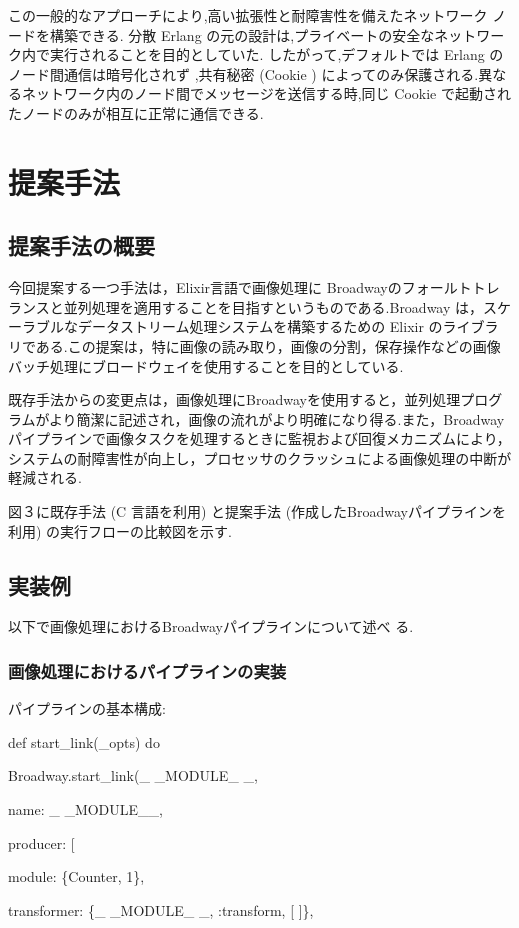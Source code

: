 \documentclass[a4paper]{jreport}	%
\begin{document}
この一般的なアプローチにより,高い拡張性と耐障害性を備えたネットワーク ノードを構築できる. 分散 Erlang の元の設計は,プライベートの安全なネットワーク内で実行されることを目的としていた. したがって,デフォルトでは Erlang のノード間通信は暗号化されず \cite{I},共有秘密 (Cookie ) によってのみ保護される.異なるネットワーク内のノード間でメッセージを送信する時,同じ Cookie で起動されたノードのみが相互に正常に通信できる.




\chapter{提案手法}
\section{提案手法の概要}
今回提案する一つ手法は，Elixir言語で画像処理に Broadwayのフォールトトレランスと並列処理を適用することを目指すというものである.Broadway は，スケーラブルなデータストリーム処理システムを構築するための Elixir のライブラリである.この提案は，特に画像の読み取り，画像の分割，保存操作などの画像バッチ処理にブロードウェイを使用することを目的としている. 

既存手法からの変更点は，画像処理にBroadwayを使用すると，並列処理プログラムがより簡潔に記述され，画像の流れがより明確になり得る.また，Broadway パイプラインで画像タスクを処理するときに監視および回復メカニズムにより，システムの耐障害性が向上し，プロセッサのクラッシュによる画像処理の中断が軽減される.

図３に既存手法 (C 言語を利用) と提案手法 (作成したBroadwayパイプラインを利用) の実行フローの比較図を示す.
\section{実装例}
以下で画像処理におけるBroadwayパイプラインについて述べ
る.
\subsection{画像処理におけるパイプラインの実装}
パイプラインの基本構成:

def start\_link(\_opts) do

    Broadway.start\_link(\_ \_MODULE\_ \_,
    
      name: \_ \_MODULE\_\_,
      
      producer: [
      
        module: \{Counter, 1\},
        
        transformer: \{\_ \_MODULE\_ \_, :transform, [ ]\},
        
\end{document}
